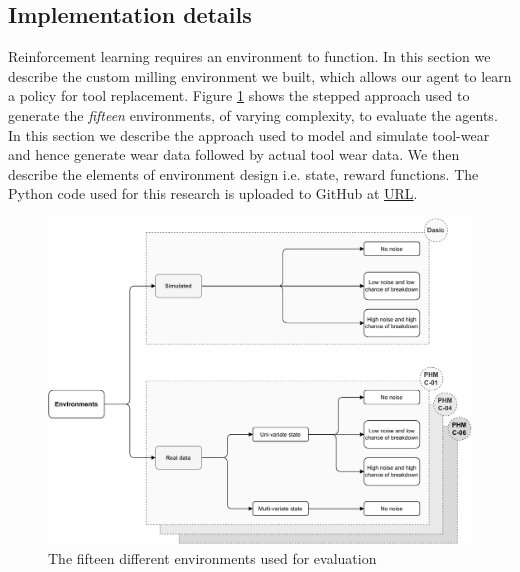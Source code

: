 \documentclass[a4paper, 12pt]{article}
\begin{document}
\subsection{Implementation details}\label{sec:Implementation}
Reinforcement learning requires an environment to function. In this section we describe the custom milling environment we built, which allows our agent to learn a policy for tool replacement. Figure \ref{fig:environments} shows the stepped approach used to generate the \textit{fifteen} environments, of varying complexity, to evaluate the agents. In this section we describe the approach used to model and simulate tool-wear and hence generate wear data followed by actual tool wear data. We then describe the elements of environment design i.e. state, reward functions. The Python code used for this research is uploaded to GitHub at \href{https://github.com/Rajesh-Siraskar/Empirical_Study_REINFORCE}{URL}.  %
\begin{figure}[ht]
	\centering
	\includegraphics[width=\textwidth]{Environments.pdf}  
	\caption{The fifteen different environments used for evaluation}
	\label{fig:environments}
\end{figure} 
\end{document}
